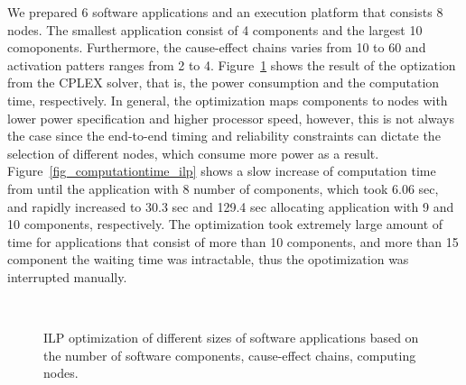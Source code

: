 We prepared 6 software applications and an execution platform that consists 8 nodes. The smallest application consist of 4 components and the largest 10 comoponents. Furthermore, the cause-effect chains varies from 10 to 60 and activation patters ranges from 2 to 4. Figure~\ref{fig_ilp_results} shows the result of the optization from the CPLEX solver, that is, the power consumption and the computation time, respectively. In general, the optimization maps components to nodes with lower power specification and higher processor speed, however, this is not always the case since the end-to-end timing and reliability constraints can dictate the selection of different nodes, which consume more power as a result. Figure~\ref{fig_computationtime_ilp} shows a slow increase of computation time from until the application with 8 number of components, which took  6.06 sec, and rapidly increased to 30.3 sec and 129.4 sec allocating application with 9 and 10 components, respectively. The optimization took extremely large amount of time for applications that consist of more than 10 components, and more than 15 component the waiting time was intractable, thus the opotimization was interrupted manually. 
\begin{figure}[h] 
	\centering
	 ~
	\caption{ILP optimization of different sizes of software applications based on the number of software components, cause-effect chains, computing nodes.} \label{fig_ilp_results}
\end{figure}


